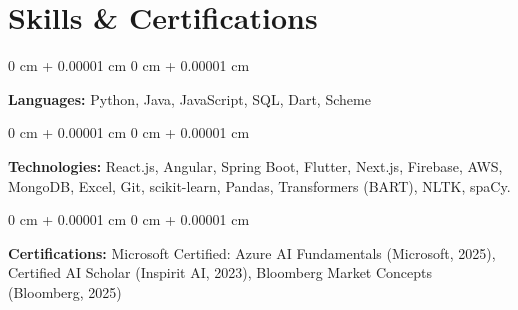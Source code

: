 \documentclass[10pt, letterpaper]{article}
\newenvironment{onecolentry}{
    \begin{adjustwidth}{
        0 cm + 0.00001 cm
    }{
        0 cm + 0.00001 cm
    }
}{
    \end{adjustwidth}
} %
\begin{document}
    
    \section{Skills \& Certifications}


        
        \begin{onecolentry}
            \textbf{Languages:} Python, Java, JavaScript, SQL, Dart, Scheme
        \end{onecolentry}

        \vspace{0.07 cm}

        \begin{onecolentry}
            \textbf{Technologies:} React.js, Angular, Spring Boot, Flutter, Next.js, Firebase, AWS, MongoDB, Excel, Git, scikit-learn, Pandas, Transformers (BART), NLTK, spaCy.
        \end{onecolentry}


        \vspace{0.07 cm}

        \begin{onecolentry}
            \textbf{Certifications:} Microsoft Certified: Azure AI Fundamentals (Microsoft, 2025), Certified AI Scholar (Inspirit AI, 2023), Bloomberg Market Concepts (Bloomberg, 2025)
        \end{onecolentry}
\end{document}
